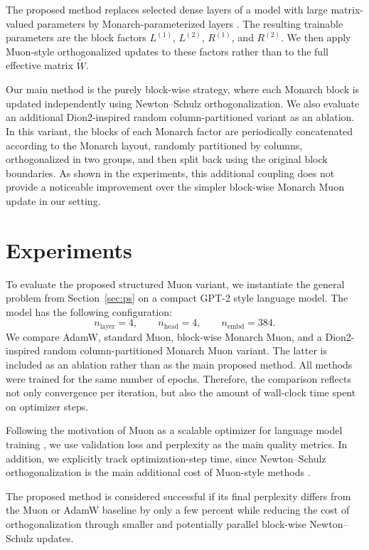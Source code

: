 \documentclass{article}
\begin{document}
The proposed method replaces selected dense layers of a model with large matrix-valued parameters by Monarch-parameterized layers \cite{dao2022monarchexpressivestructuredmatrices}. The resulting trainable parameters are the block factors \(L^{(1)}\), \(L^{(2)}\), \(R^{(1)}\), and \(R^{(2)}\). We then apply Muon-style orthogonalized updates to these factors rather than to the full effective matrix \(\widetilde{W}\).

Our main method is the purely block-wise strategy, where each Monarch block is updated independently using Newton--Schulz orthogonalization. We also evaluate an additional Dion2-inspired random column-partitioned variant as an ablation. In this variant, the blocks of each Monarch factor are periodically concatenated according to the Monarch layout, randomly partitioned by columns, orthogonalized in two groups, and then split back using the original block boundaries. As shown in the experiments, this additional coupling does not provide a noticeable improvement over the simpler block-wise Monarch Muon update in our setting.

\section{Experiments}\label{sec:exp}

To evaluate the proposed structured Muon variant, we instantiate the general problem from Section~\ref{sec:ps} on a compact GPT-2 style language model. The model has the following configuration:
\[
n_{\mathrm{layer}} = 4, \qquad
n_{\mathrm{head}} = 4, \qquad
n_{\mathrm{embd}} = 384.
\]
We compare AdamW, standard Muon, block-wise Monarch Muon, and a Dion2-inspired random column-partitioned Monarch Muon variant. The latter is included as an ablation rather than as the main proposed method. All methods were trained for the same number of epochs. Therefore, the comparison reflects not only convergence per iteration, but also the amount of wall-clock time spent on optimizer steps.

Following the motivation of Muon as a scalable optimizer for language model training \cite{liu2025muonscalablellmtraining}, we use validation loss and perplexity as the main quality metrics. In addition, we explicitly track optimization-step time, since Newton--Schulz orthogonalization is the main additional cost of Muon-style methods \cite{jordan2024muon,GramNewtonSchulz,amsel2026polarexpressoptimalmatrix}.

The proposed method is considered successful if its final perplexity differs from the Muon or AdamW baseline by only a few percent while reducing the cost of orthogonalization through smaller and potentially parallel block-wise Newton--Schulz updates.
\end{document}
